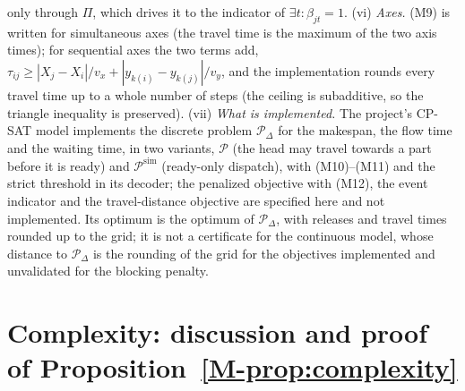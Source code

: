 \documentclass[11pt,a4paper]{article}
\theoremstyle{plain}
\theoremstyle{definition}
\theoremstyle{remark}
\newcommand{\Pb}{\mathcal{P}}
\newcommand{\Psim}{\Pb^{\mathrm{sim}}}
\begin{document}
only through $\Pi$, which drives it to the indicator of $\exists t:\beta_{jt}=1$.
(vi) \emph{Axes.} (M9) is written for simultaneous axes (the travel time is the maximum
of the two axis times); for sequential axes the two terms add,
$\tau_{ij}\ge|X_j-X_i|/v_x+|y_{k(i)}-y_{k(j)}|/v_y$, and the implementation rounds every
travel time up to a whole number of steps (the ceiling is subadditive, so the triangle
inequality is preserved). (vii) \emph{What is implemented.} The project's CP-SAT model
implements the discrete problem $\Pb_\Delta$ for the makespan, the flow time and the
waiting time, in two variants, $\Pb$ (the head may travel towards a part before it is
ready) and $\Psim$ (ready-only dispatch), with (M10)--(M11) and the strict threshold in
its decoder; the penalized objective with (M12), the event indicator and the
travel-distance objective are specified here and not implemented. Its optimum is the
optimum of $\Pb_\Delta$, with releases and travel times rounded up to the grid; it is not
a certificate for the continuous model, whose distance to $\Pb_\Delta$ is the rounding
of the grid for the objectives implemented and unvalidated for the blocking penalty.

\section{Complexity: discussion and proof of Proposition~\ref{M-prop:complexity}}\label{app:complexity}
\end{document}
